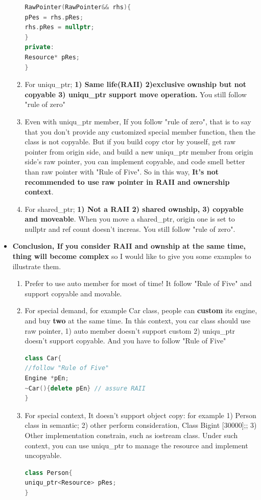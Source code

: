 \documentclass[a4paper,12pt,twoside]{book}
\begin{document}
\begin{itemize}
\begin{enumerate}
\begin{lstlisting}[frame=single, language=c++]
RawPointer(RawPointer&& rhs){
pPes = rhs.pRes;
rhs.pRes = nullptr;
}
private:
Resource* pRes;
}
\end{lstlisting}

\item For uniqu\_ptr; \textbf{1) Same life(RAII) 2)exclusive ownship but not copyable 3) uniqu\_ptr support move operation. } You still follow "rule of zero"

\item Even with uniqu\_ptr member, If you follow "rule of zero", that is to say that you don't provide any customized special member function, then the class is not copyable. But if you build copy ctor by youself, get raw pointer from origin side, and build a new uniqu\_ptr member from origin side's raw pointer, you can implement copyable, and code smell better than raw pointer with "Rule of Five". So in this way, \textbf{It's not recommended to use raw pointer in RAII and ownership context}.

\item For shared\_ptr; \textbf{1) Not a RAII 2) shared ownship, 3) copyable and moveable}. When you move a shared\_ptr, origin one is set to nullptr and ref count doesn't increas.  You still follow "rule of zero".

\end{enumerate}

\item \textbf{ Conclusion, If you consider RAII and ownship at the same time, thing will become complex}  so I would like to give you some examples to illustrate them.

\begin{enumerate}
\item Prefer to use auto member for most of time! It follow "Rule of Five" and support copyable and movable.

\item  For special demand, for example Car class,  people can \textbf{custom} its engine, and buy \textbf{two} at the same time. In this context, you car class should use raw pointer, 1) auto member doesn't support custom 2) uniqu\_ptr doesn't support copyable.  And you have to follow "Rule of Five"
\begin{lstlisting}[frame=single, language=c++]
class Car{
//follow "Rule of Five"
Engine *pEn;
~Car(){delete pEn} // assure RAII
}
\end{lstlisting}

\item For special context, It doesn't support object copy: for example 1) Person class in semantic;  2) other  perform consideration, Class Big{int [30000];};  3) Other implementation constrain, such as iostream class.   Under such context, you can use uniqu\_ptr to manage the resource and implement uncopyable.
\begin{lstlisting}[frame=single, language=c++]
class Person{
uniqu_ptr<Resource> pRes;
}
\end{lstlisting}


\end{enumerate}
\end{itemize}
\end{document}
